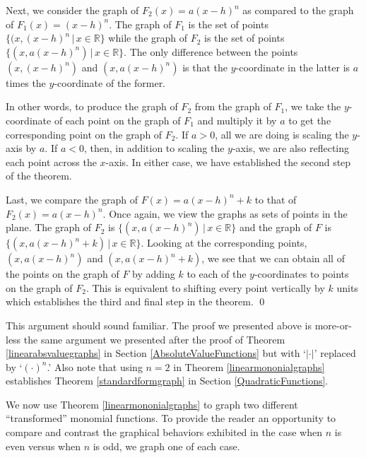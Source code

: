 \documentclass{ximera}
\begin{document}

Next, we consider the graph of $F_{2}(x) = a(x-h)^n$ as compared to the graph of $F_{1}(x) = (x-h)^n$.  The graph of $F_{1}$ is the set of points $\{ (x, (x-h)^n \, | \, x \in \mathbb{R} \}$ while the graph of $F_{2}$ is the set of points $\{ (x, a(x-h)^n) \, | \, x \in \mathbb{R} \}$.  The only difference between the points $(x, (x-h)^n)$ and $(x, a(x-h)^n)$ is that the $y$-coordinate in the latter is $a$ times the $y$-coordinate of the former.  


In other words, to produce the graph of $F_{2}$ from the graph of $F_{1}$, we take the $y$-coordinate of each point on the graph of $F_{1}$ and multiply it by $a$ to get the corresponding point on the graph of $F_{2}$.  If $a>0$, all we are doing is scaling the $y$-axis by $a$.  If $a<0$, then, in addition to scaling the $y$-axis, we are also reflecting each point across the $x$-axis.  In either case, we have established the second step of the theorem.


Last, we compare the graph of $F(x) = a(x-h)^n + k$ to that of $F_{2}(x) = a(x-h)^n$.  Once again, we view the graphs as sets of points in the plane.  The graph of $F_{2}$ is $\{ (x, a(x-h)^n) \, | \, x \in \mathbb{R} \}$ and the graph of $F$ is$\{ (x, a(x-h)^n+k) \, | \, x \in \mathbb{R} \}$.  Looking at the corresponding points, $(x, a(x-h)^n)$ and $(x, a(x-h)^n+k)$, we see that we can obtain all of the points on the graph of $F$ by adding $k$ to each of the $y$-coordinates to points on the graph of $F_{2}$. This is equivalent to  shifting every point vertically by $k$ units which establishes the third and final step in the theorem. \qed


This argument should sound familiar.  The proof we presented above is more-or-less the same argument we presented after the proof of Theorem \ref{linearabsvaluegraphs} in Section \ref{AbsoluteValueFunctions} but with `$| \cdot |$' replaced by `$(\cdot)^n$.'  Also note that using $n =2$ in Theorem \ref{linearmononialgraphs} establishes Theorem \ref{standardformgraph} in Section \ref{QuadraticFunctions}. 


We now use Theorem \ref{linearmononialgraphs} to graph two different ``transformed'' monomial functions. To provide the reader an opportunity to compare and contrast the graphical behaviors exhibited in the case when $n$ is even versus when $n$ is odd, we graph one of each case.
\end{document}
